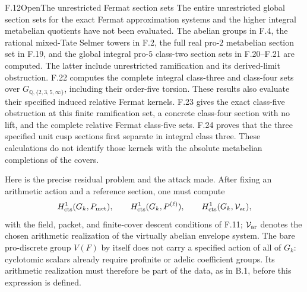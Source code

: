 \begin{statement}{F.12}{Open}{The unrestricted Fermat section sets}
The entire unrestricted global section sets for the exact
Fermat approximation systems and the higher integral
metabelian quotients have not been evaluated.
The abelian groups in F.4, the rational mixed-Tate
Selmer towers in F.2, the full real pro-$2$ metabelian
section set in F.19, and the global integral pro-$5$
class-two section sets in F.20--F.21 are computed.
The latter include unrestricted ramification and its
derived-limit obstruction. F.22 computes the complete
integral class-three and class-four sets over
\(G_{\mathbb Q,\{2,3,5,\infty\}}\), including their
order-five torsion. These results also evaluate
their specified induced relative Fermat kernels.
F.23 gives the exact class-five obstruction at this
finite ramification set, a concrete class-four section
with no lift, and the complete relative Fermat
class-five sets. F.24 proves that the three specified
unit cusp sections first separate in integral class
three. These calculations
do not identify those kernels with the absolute
metabelian completions of the covers.
\end{statement}
Here is the precise residual problem and the attack made.
After fixing an arithmetic action and a reference section,
one must compute
\[
 H^1_{\rm cts}(G_k,P_{\rm met}),\qquad
 H^1_{\rm cts}(G_k,P^{(\ell)}),\qquad
 H^1_{\rm cts}(G_k,\mathcal V_{\rm ar}),
\]
with the field, packet, and finite-cover descent conditions
of F.11; $\mathcal V_{\rm ar}$ denotes the chosen arithmetic
realization of the virtually abelian envelope system.
The bare pro-discrete group $V(F)$ by itself does not
carry a specified action of all of $G_k$: cyclotomic
scalars already require profinite or adelic coefficient
groups. Its arithmetic realization must therefore be
part of the data, as in B.1, before this expression is
defined.

